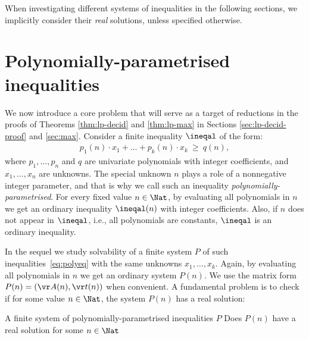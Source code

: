 

When investigating different systems of inequalities in the following sections, we
implicitly consider their \emph{real} solutions, unless specified otherwise.




 


\section{Polynomially-parametrised inequalities}
\label{sec:poly}



We now introduce a core problem that will serve as a target of reductions in the proofs of Theorems \ref{thm:lp-decid} and \ref{thm:lp-max}  in Sections \ref{sec:lp-decid-proof} and \ref{sec:max}.
Consider a finite inequality $\ineqal$ of the form:
%
\begin{align} \label{eq:polyeq}
p_1(n) \cdot x_1 + \ldots + p_k(n) \cdot x_k \ \geq \ q(n),
\end{align}
%
where $p_1, \ldots, p_n$ and $q$ are univariate polynomials with integer coefficients, 
and $x_1, \ldots, x_n$ are unknowns.
The special unknown $n$ plays a role of a nonnegative integer parameter, and that is why we call such an inequality
\emph{polynomially-parametrised}.
For every fixed value $n\in\Nat$, by evaluating all polynomials in $n$ we get an ordinary
inequality  $\ineqal(n)$ with integer coefficients.
Also, if $n$ does not appear in $\ineqal$, i.e., all polynomials are constants, $\ineqal$ is an ordinary inequality.

In the sequel we study solvability of a finite system $P$ of such inequalities~\eqref{eq:polyeq} 
with the same unknowns $x_1, \ldots, x_k$.
Again,
by evaluating all polynomials in $n$ we get an ordinary system $P(n)$.
We use the matrix form $P(n) = (\vr A(n), \vr t(n))$ when convenient.
A fundamental problem is to check if for some value $n\in\Nat$, the system $P(n)$ has a real solution:

\prob{\polyineqsolvname}
{A finite system of polynomially-parametrised inequalities $P$} 
{Does $P(n)$ have a real solution for some $n\in \Nat$}
%

